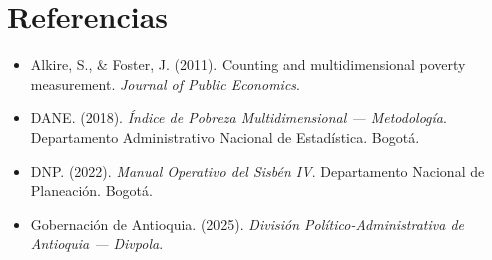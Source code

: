 \documentclass[12pt, a4paper]{article}
\begin{document}
\section{Referencias}

\begin{itemize}
    \item Alkire, S., \& Foster, J. (2011). Counting and multidimensional poverty measurement. \textit{Journal of Public Economics}.
    \item DANE. (2018). \textit{Índice de Pobreza Multidimensional — Metodología}. Departamento Administrativo Nacional de Estadística. Bogotá.
    \item DNP. (2022). \textit{Manual Operativo del Sisbén IV}. Departamento Nacional de Planeación. Bogotá.
    \item Gobernación de Antioquia. (2025). \textit{División Político-Administrativa de Antioquia — Divpola}.
\end{itemize}
\end{document}
